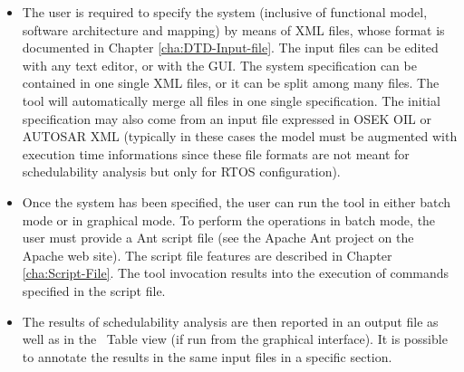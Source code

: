 \begin{itemize}
\item The user is required to specify the system (inclusive of
  functional model, software architecture and mapping) by means of XML
  files, whose format is documented in Chapter
  \ref{cha:DTD-Input-file}. The input files can be edited with any
  text editor, or with the GUI. The system specification can be
  contained in one single XML files, or it can be split among many
  files. The tool will automatically merge all files in one single
  specification. The initial specification may also come from an input
  file expressed in OSEK OIL or AUTOSAR XML (typically in these cases
  the model must be augmented with execution time informations since
  these file formats are not meant for schedulability analysis but
  only for RTOS configuration).
\item Once the system has been specified, the user can run the tool in
  either batch mode or in graphical mode. To perform the operations in
  batch mode, the user must provide a Ant script file (see the Apache
  Ant project on the Apache web site). The script file features are
  described in Chapter \ref{cha:Script-File}. The tool invocation
  results into the execution of commands specified in the script file.
\item The results of schedulability analysis are then reported in an
  output file as well as in the \rtd\ Table view (if run from the
  graphical interface). It is possible to annotate the results in the
  same input files in a specific section.
\end{itemize}

